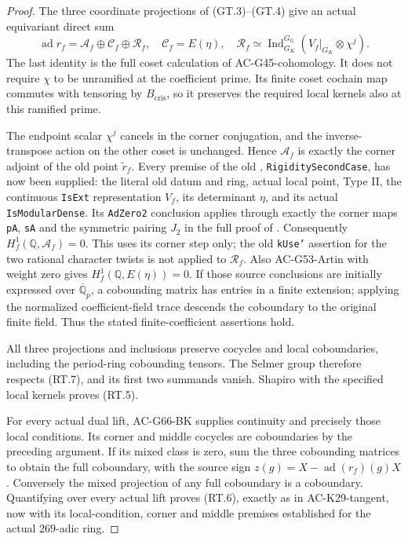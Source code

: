 \begin{proof}
The three coordinate projections of (GT.3)--(GT.4)
give an actual equivariant direct sum
\[
 \operatorname{ad}r_f
       =\mathcal A_f\oplus\mathcal C_f\oplus\mathcal R_f,
 \quad \mathcal C_f=E(\eta),\quad
 \mathcal R_f\simeq
       \operatorname{Ind}_{G_K}^{G_{\mathbb Q}}
                  (V_f|_{G_K}\otimes\chi^j).
                                                        \tag{RT.7}
\]
The last identity is the full coset calculation of
AC-G45-cohomology. It does not require \(\chi\) to
be unramified at the coefficient prime. Its finite
coset cochain map commutes with tensoring by
\(B_{\mathrm{cris}}\), so it preserves the required
local kernels also at this ramified prime.

The endpoint scalar \(\chi^j\) cancels in the
corner conjugation, and the inverse-transpose
action on the other coset is unchanged. Hence
\(\mathcal A_f\) is exactly the corner adjoint
of the old point \(\widetilde r_f\).
Every premise of the old
,
\texttt{RigiditySecondCase}, has now been supplied:
the literal old datum and ring, actual local point,
Type II, the continuous \texttt{IsExt} representation
\(V_f\), its determinant \(\eta\), and its actual
\texttt{IsModularDense}. Its \texttt{AdZero2}
conclusion applies through exactly the corner
maps \texttt{pA}, \texttt{sA} and the symmetric
pairing \(J_2\) in the full proof of
.
Consequently \(H_f^1(\mathbb Q,\mathcal A_f)=0\).
This uses its corner step only; the old
\texttt{kUse'} assertion for the two rational
character twists is not applied to \(\mathcal R_f\).
Also AC-G53-Artin with weight zero gives
\(H_f^1(\mathbb Q,E(\eta))=0\).
If those source conclusions are initially expressed
over \(\overline{\mathbb Q}_p\), a cobounding
matrix has entries in a finite extension; applying
the normalized coefficient-field trace descends
the coboundary to the original finite field.
Thus the stated finite-coefficient assertions hold.

All three projections and inclusions preserve
cocycles and local coboundaries, including the
period-ring cobounding tensors. The Selmer group
therefore respects (RT.7), and its first two
summands vanish. Shapiro with the specified local
kernels proves (RT.5).

For every actual dual lift, AC-G66-BK supplies
continuity and precisely those local conditions.
Its corner and middle cocycles are coboundaries
by the preceding argument. If its mixed class
is zero, sum the three cobounding matrices to
obtain the full coboundary, with the source sign
\(z(g)=X-\operatorname{ad}(r_f)(g)X\).
Conversely the mixed projection of any full
coboundary is a coboundary. Quantifying over
every actual lift proves (RT.6), exactly as in
AC-K29-tangent, now with its local-condition,
corner and middle premises established for
the actual \(269\)-adic ring.
\end{proof}

